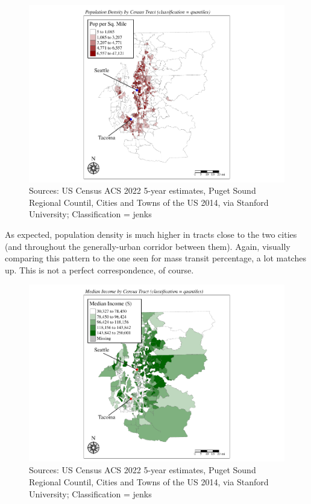 \documentclass[
]{article}
\begin{document}
\begin{figure}
\centering
\includegraphics{transit-hotspots-PSRC_files/figure-latex/unnamed-chunk-5-1.pdf}
\caption{Sources: US Census ACS 2022 5-year estimates, Puget Sound
Regional Countil, Cities and Towns of the US 2014, via Stanford
University; Classification = jenks}
\end{figure}

As expected, population density is much higher in tracts close to the
two cities (and throughout the generally-urban corridor between them).
Again, visually comparing this pattern to the one seen for mass transit
percentage, a lot matches up. This is not a perfect correspondence, of
course.

\newpage

\begin{figure}
\centering
\includegraphics{transit-hotspots-PSRC_files/figure-latex/unnamed-chunk-6-1.pdf}
\caption{Sources: US Census ACS 2022 5-year estimates, Puget Sound
Regional Countil, Cities and Towns of the US 2014, via Stanford
University; Classification = jenks}
\end{figure}
\end{document}
